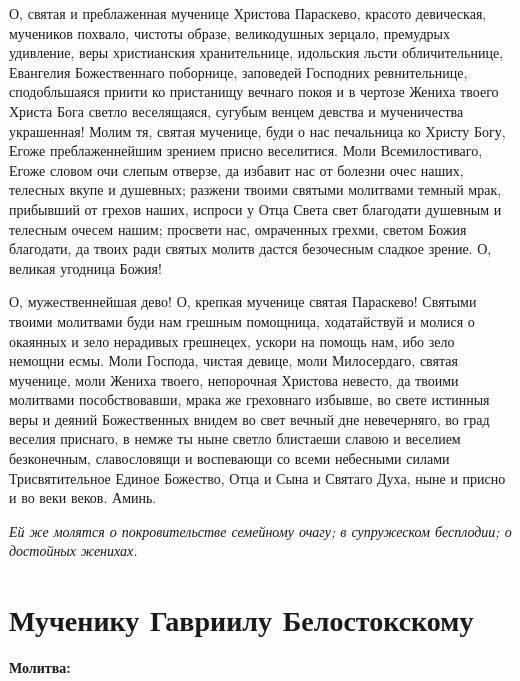 

О, святая и преблаженная мученице Христова Параскево, красото девическая, мучеников похвало, чистоты образе, великодушных зерцало, премудрых удивление, веры христианския хранительнице, идольския льсти обличительнице, Евангелия Божественнаго поборнице, заповедей Господних ревнительнице, сподобльшаяся приити ко пристанищу вечнаго покоя и в чертозе Жениха твоего Христа Бога светло веселящаяся, сугубым венцем девства и мученичества украшенная! Молим тя, святая мученице, буди о нас печальница ко Христу Богу, Егоже преблаженнейшим зрением присно веселитися. Моли Всемилостиваго, Егоже словом очи слепым отверзе, да избавит нас от болезни очес наших, телесных вкупе и душевных; разжени твоими святыми молитвами темный мрак, прибывший от грехов наших, испроси у Отца Света свет благодати душевным и телесным очесем нашим; просвети нас, омраченных грехми, светом Божия благодати, да твоих ради святых молитв дастся безочесным сладкое зрение. О, великая угодница Божия!

О, мужественнейшая дево! О, крепкая мученице святая Параскево! Святыми твоими молитвами буди нам грешным помощница, ходатайствуй и молися о окаянных и зело нерадивых грешнецех, ускори на помощь нам, ибо зело немощни есмы. Моли Господа, чистая девице, моли Милосердаго, святая мученице, моли Жениха твоего, непорочная Христова невесто, да твоими молитвами пособствовавши, мрака же греховнаго избывше, во свете истинныя веры и деяний Божественных внидем во свет вечный дне невечерняго, во град веселия приснаго, в немже ты ныне светло блистаеши славою и веселием безконечным, славословящи и воспевающи со всеми небесными силами Трисвятительное Единое Божество, Отца и Сына и Святаго Духа, ныне и присно и во веки веков. Аминь.

\itshape Ей же молятся о покровительстве семейному очагу; в супружеском бесплодии; о достойных женихах.\normalfont{}\mychapterending


 

\section{Мученику Гавриилу Белостокскому}
 
\bfseries Молитва:\normalfont{}



